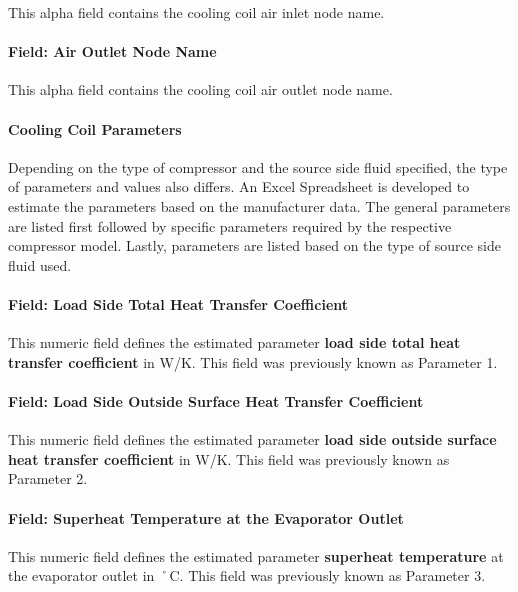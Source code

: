 This alpha field contains the cooling coil air inlet node name.

\paragraph{Field: Air Outlet Node Name}\label{field-air-outlet-node-name-16}

This alpha field contains the cooling coil air outlet node name.

\paragraph{Cooling Coil Parameters}\label{cooling-coil-parameters}

Depending on the type of compressor and the source side fluid specified, the type of parameters and values also differs. An Excel Spreadsheet is developed to estimate the parameters based on the manufacturer data. The general parameters are listed first followed by specific parameters required by the respective compressor model. Lastly, parameters are listed based on the type of source side fluid used.

\paragraph{Field: Load Side Total Heat Transfer Coefficient}\label{field-load-side-total-heat-transfer-coefficient}

This numeric field defines the estimated parameter \textbf{load side total heat transfer coefficient} in W/K. This field was previously known as Parameter 1.

\paragraph{Field: Load Side Outside Surface Heat Transfer Coefficient}\label{field-load-side-outside-surface-heat-transfer-coefficient}

This numeric field defines the estimated parameter \textbf{load side outside surface heat transfer coefficient} in W/K. This field was previously known as Parameter 2.

\paragraph{Field: Superheat Temperature at the Evaporator Outlet}\label{field-superheat-temperature-at-the-evaporator-outlet}

This numeric field defines the estimated parameter \textbf{superheat temperature} at the evaporator outlet in ˚C. This field was previously known as Parameter 3.


